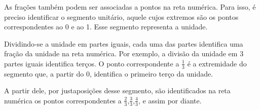 As frações também podem ser associadas a pontos na reta numérica. Para isso, é preciso identificar o segmento unitário, aquele cujos extremos são os pontos correspondentes ao 0 e ao 1. Esse segmento representa a unidade.
\begin{center}
\end{center}

Dividindo-se a unidade em partes iguais,  cada uma das partes identifica uma fração da unidade na reta numérica.
Por exemplo, a divisão da unidade em 3 partes iguais identifica terços. O ponto correspondente a $\frac{1}{3}$  é a extremidade do segmento que, a partir do 0, identifica o primeiro terço da unidade. 

\begin{center}
\end{center}


A partir dele, por justaposições desse segmento, são identificados na reta numérica os pontos correspondentes a $\frac{2}{3}$,$\frac{3}{3}$,$\frac{4}{3}$, e assim por diante. 



